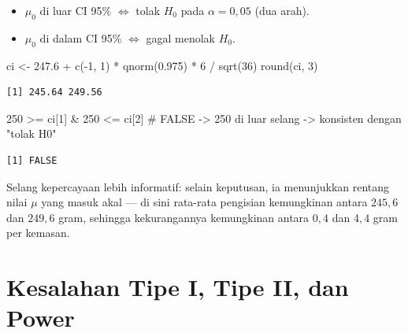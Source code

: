 \documentclass[
  indonesian,
  letterpaper,
]{book}
\newenvironment{Shaded}{\begin{snugshade}}{\end{snugshade}}
\newcommand{\CommentTok}[1]{\textcolor[rgb]{0.37,0.37,0.37}{#1}}
\newcommand{\DecValTok}[1]{\textcolor[rgb]{0.68,0.00,0.00}{#1}}
\newcommand{\FloatTok}[1]{\textcolor[rgb]{0.68,0.00,0.00}{#1}}
\newcommand{\FunctionTok}[1]{\textcolor[rgb]{0.28,0.35,0.67}{#1}}
\newcommand{\NormalTok}[1]{\textcolor[rgb]{0.00,0.23,0.31}{#1}}
\newcommand{\OtherTok}[1]{\textcolor[rgb]{0.00,0.23,0.31}{#1}}
\newcommand{\SpecialCharTok}[1]{\textcolor[rgb]{0.37,0.37,0.37}{#1}}
\providecommand{\tightlist}{%
  \setlength{\itemsep}{0pt}\setlength{\parskip}{0pt}}
\begin{document}
\begin{itemize}
\tightlist
\item
  \(\mu_0\) di luar CI 95\% \(\iff\) tolak \(H_0\) pada
  \(\alpha = 0{,}05\) (dua arah).
\item
  \(\mu_0\) di dalam CI 95\% \(\iff\) gagal menolak \(H_0\).
\end{itemize}

\begin{Shaded}
\begin{Highlighting}[]
\NormalTok{ci }\OtherTok{\textless{}{-}} \FloatTok{247.6} \SpecialCharTok{+} \FunctionTok{c}\NormalTok{(}\SpecialCharTok{{-}}\DecValTok{1}\NormalTok{, }\DecValTok{1}\NormalTok{) }\SpecialCharTok{*} \FunctionTok{qnorm}\NormalTok{(}\FloatTok{0.975}\NormalTok{) }\SpecialCharTok{*} \DecValTok{6} \SpecialCharTok{/} \FunctionTok{sqrt}\NormalTok{(}\DecValTok{36}\NormalTok{)}
\FunctionTok{round}\NormalTok{(ci, }\DecValTok{3}\NormalTok{)}
\end{Highlighting}
\end{Shaded}

\begin{verbatim}
[1] 245.64 249.56
\end{verbatim}

\begin{Shaded}
\begin{Highlighting}[]
\DecValTok{250} \SpecialCharTok{\textgreater{}=}\NormalTok{ ci[}\DecValTok{1}\NormalTok{] }\SpecialCharTok{\&} \DecValTok{250} \SpecialCharTok{\textless{}=}\NormalTok{ ci[}\DecValTok{2}\NormalTok{] }\CommentTok{\# FALSE {-}\textgreater{} 250 di luar selang {-}\textgreater{} konsisten dengan "tolak H0"}
\end{Highlighting}
\end{Shaded}

\begin{verbatim}
[1] FALSE
\end{verbatim}

Selang kepercayaan lebih informatif: selain keputusan, ia menunjukkan
rentang nilai \(\mu\) yang masuk akal --- di sini rata-rata pengisian
kemungkinan antara \(245{,}6\) dan \(249{,}6\) gram, sehingga
kekurangannya kemungkinan antara \(0{,}4\) dan \(4{,}4\) gram per
kemasan.

\section{Kesalahan Tipe I, Tipe II, dan
Power}\label{kesalahan-tipe-i-tipe-ii-dan-power}
\end{document}
